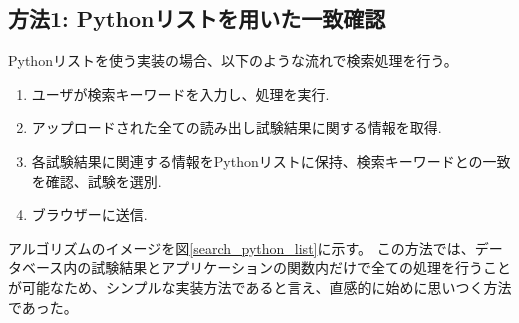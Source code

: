 \subsection{方法1: Pythonリストを用いた一致確認}
Pythonリストを使う実装の場合、以下のような流れで検索処理を行う。
\begin{enumerate}
  \item ユーザが検索キーワードを入力し、処理を実行.
  \item アップロードされた全ての読み出し試験結果に関する情報を取得.
  \item 各試験結果に関連する情報をPythonリストに保持、検索キーワードとの一致を確認、試験を選別.
  \item ブラウザーに送信.
\end{enumerate}

アルゴリズムのイメージを図\ref{search_python_list}に示す。
この方法では、データベース内の試験結果とアプリケーションの関数内だけで全ての処理を行うことが可能なため、シンプルな実装方法であると言え、直感的に始めに思いつく方法であった。

